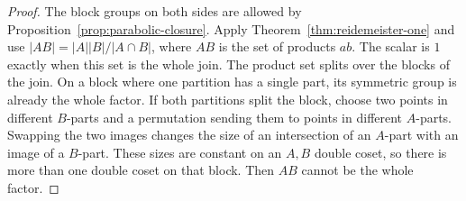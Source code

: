 \documentclass[11pt,a4paper]{article}
\numberwithin{equation}{section}
\theoremstyle{definition}
\begin{document}
\begin{proof}
The block groups on both sides are allowed by
Proposition~\ref{prop:parabolic-closure}. Apply
Theorem~\ref{thm:reidemeister-one} and use
\(|AB|=|A||B|/|A\cap B|\), where \(AB\) is the set of products \(ab\).
The scalar is \(1\) exactly when this set is the whole join.
The product set splits over the blocks of the join. On a block where
one partition has a single part, its symmetric group is already
the whole factor. If both partitions split the block, choose two
points in different \(B\)-parts and a permutation sending them
to points in different \(A\)-parts. Swapping the two images changes
the size of an intersection of an \(A\)-part with an image of a
\(B\)-part. These sizes are constant on an \(A,B\) double coset,
so there is more than one double coset on that block. Then \(AB\)
cannot be the whole factor.
\end{proof}
\end{document}
